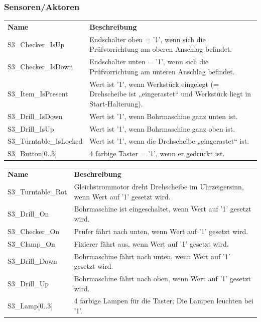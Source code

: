 \documentclass[11pt,a4paper,ngerman]{article}
\begin{document}
\subsubsection{Sensoren/Aktoren}
\begin{center}
	\setlength\extrarowheight{4pt}
	\small
	\begin{tabularx}{\textwidth}{|p{4cm}|X|}
		\hline
		\rowcolor{tublau}
		\multicolumn{2}{|c|}{\bf \color{white} \large Sensoren}\\
		\hline\hline
		\rowcolor{gray!80}
		\bf Name & \bf Beschreibung\\
		\hline\hline
		S3\_Checker\_IsUp & Endschalter oben = '1', wenn sich die Prüfvorrichtung am oberen Anschlag befindet.\\
		S3\_Checker\_IsDown & Endschalter unten = '1', wenn sich die Prüfvorrichtung am unteren Anschlag befindet.\\
		S3\_Item\_IsPresent & Wert ist '1', wenn Werkstück eingelegt (= Drehscheibe ist „eingerastet“ und Werkstück liegt in Start-Halterung).\\
		S3\_Drill\_IsDown & Wert ist '1', wenn Bohrmaschine ganz unten ist.\\
		S3\_Drill\_IsUp & Wert ist '1', wenn Bohrmaschine ganz oben ist.\\
		S3\_Turntable\_IsLocked & Wert ist '1', wenn die Drehscheibe „eingerastet“ ist.\\
		S3\_Button[0..3] & 4 farbige Taster = '1', wenn er gedrückt ist.\\
		\hline
	\end{tabularx}
	
	\medskip
	
	\begin{tabularx}{\textwidth}{|p{4cm}|X|}
		\hline
		\rowcolor{tublau}
		\multicolumn{2}{|c|}{\bf \color{white} \large Aktoren}\\
		\hline\hline
		\rowcolor{gray!80}
		\bf Name & \bf Beschreibung\\
		\hline\hline
		S3\_Turntable\_Rot & Gleichstrommotor dreht Drehscheibe im Uhrzeigersinn, wenn Wert auf '1' gesetzt wird.\\
		S3\_Drill\_On & Bohrmaschine ist eingeschaltet, wenn Wert auf '1' gesetzt wird.\\
		S3\_Checker\_On & Prüfer fährt nach unten, wenn Wert auf '1' gesetzt wird.\\
		S3\_Clamp\_On & Fixierer fährt aus, wenn Wert auf '1' gesetzt wird.\\
		S3\_Drill\_Down & Bohrmaschine fährt nach unten, wenn Wert auf '1' gesetzt wird.\\
		S3\_Drill\_Up & Bohrmaschine fährt nach oben, wenn Wert auf '1' gesetzt wird.\\
		S3\_Lamp[0..3] & 4 farbige Lampen für die Taster; Die Lampen leuchten bei '1'.\\
		\hline
	\end{tabularx}
\end{center}
\end{document}

